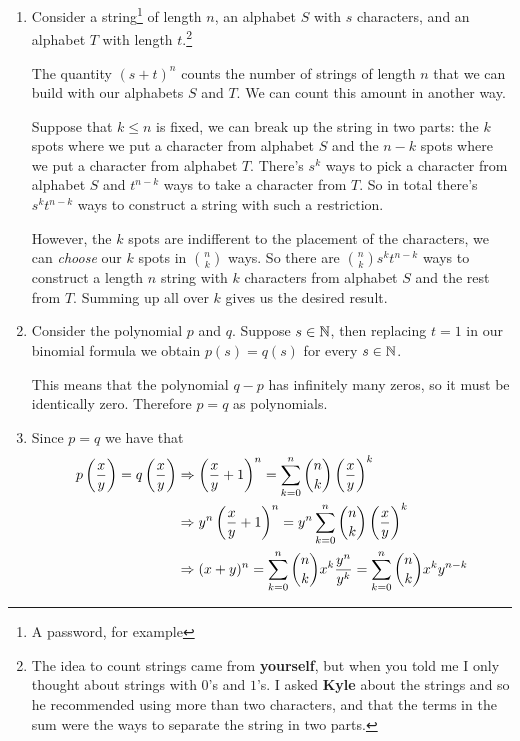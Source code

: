 \documentclass[12pt]{memoir}
\begin{document}
\begin{ptcbr}
    \begin{enumerate}
        \itemsep=-0.4em
        \item 
        Consider a string\footnote{A password, for example} of length $n$, an alphabet $S$ with $s$ characters, and an alphabet $T$ with length $t$.\footnote{The idea to count strings came from \textbf{yourself}, but when you told me I only thought about strings with $0$'s and $1$'s. I asked \textbf{Kyle} about the strings and so he recommended using more than two characters, and that the terms in the sum were the ways to separate the string in two parts.}\par 
        The quantity $(s+t)^n$ counts the number of strings of length $n$ that we can build with our alphabets $S$ and $T$. We can count this amount in another way.\par 
        Suppose that $k\leq n$ is fixed, we can break up the string in two parts: the $k$ spots where we put a character from alphabet $S$ and the $n-k$ spots where we put a character from alphabet $T$. There's $s^k$ ways to pick a character from alphabet $S$ and $t^{n-k}$ ways to take a character from $T$. So in total there's $s^kt^{n-k}$ ways to construct a string with such a restriction.\par 
        However, the $k$ spots are indifferent to the placement of the characters, we can \emph{choose} our $k$ spots in $\binom{n}{k}$ ways. So there are $\binom{n}{k}s^kt^{n-k}$ ways to construct a length $n$ string with $k$ characters from alphabet $S$ and the rest from $T$. Summing up all over $k$ gives us the desired result.
        \item Consider the polynomial $p$ and $q$. Suppose $s\in\mathbb{N}$, then replacing $t=1$ in our binomial formula we obtain $p(s)=q(s)$ for every $s\in\mathbb{N}$.\par 
        This means that the polynomial $q-p$ has infinitely many zeros, so it must be identically zero. Therefore $p=q$ as polynomials.
        \item Since $p=q$ we have that 
        \begin{align*}
            p\left(\frac{x}{y}\right)=q\left(\frac{x}{y}\right)&\Rightarrow \left(\frac{x}{y}+1\right)^n=\sum_{k=0}^n\binom{n}{k}\left(\frac{x}{y}\right)^k\\
            &\Rightarrow {y^n}\left(\frac{x}{y}+1\right)^n={y^n}\sum_{k=0}^n\binom{n}{k}\left(\frac{x}{y}\right)^k\\
            &\Rightarrow(x+y)^n=\sum_{k=0}^n\binom{n}{k}x^k\frac{y^n}{y^k}=\sum_{k=0}^n\binom{n}{k}x^ky^{n-k}
        \end{align*}
    \end{enumerate}
\end{ptcbr}
\end{document}
